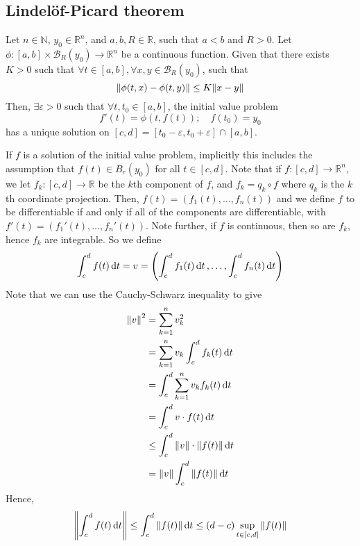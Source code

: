 \subsection{Lindel\"of-Picard theorem}
\begin{theorem}
	Let \( n \in \mathbb N \), \( y_0 \in \mathbb R^n \), and \( a,b,R \in \mathbb R \), such that \( a < b \) and \( R > 0 \).
	Let \( \phi \colon [a,b] \times \mathcal B_R(y_0) \to \mathbb R^n \) be a continuous function.
	Given that there exists \( K > 0 \) such that \( \forall t \in [a,b], \forall x,y \in \mathcal B_R(y_0) \), such that
	\[
		\norm{\phi(t,x) - \phi(t,y)} \leq K \norm{x-y}
	\]
	Then, \( \exists \varepsilon > 0 \) such that \( \forall t, t_0 \in [a,b] \), the initial value problem
	\[
		f'(t) = \phi(t, f(t));\quad f(t_0) = y_0
	\]
	has a unique solution on \( [c,d] = [t_0 - \varepsilon, t_0 + \varepsilon] \cap [a,b] \).
\end{theorem}
\begin{remark}
	If \( f \) is a solution of the initial value problem, implicitly this includes the assumption that \( f(t) \in B_r(y_0) \) for all \( t \in [c,d] \).
	Note that if \( f \colon [c,d] \to \mathbb R^n \), we let \( f_k \colon [c,d] \to \mathbb R \) be the \( k \)th component of \( f \), and \( f_k = q_k \circ f \) where \( q_k \) is the \( k \)th coordinate projection.
	Then, \( f(t) = (f_1(t), \dots, f_n(t)) \) and we define \( f \) to be differentiable if and only if all of the components are differentiable, with \( f'(t) = (f_1'(t), \dots, f_n'(t)) \).
	Note further, if \( f \) is continuous, then so are \( f_k \), hence \( f_k \) are integrable.
	So we define
	\[
		\int_c^d f(t) \dd{t} = v = \qty(\int_c^d f_1(t) \dd{t}, \dots, \int_c^d f_n(t) \dd{t})
	\]
	Note that we can use the Cauchy-Schwarz inequality to give
	\begin{align*}
		\norm{v}^2 &= \sum_{k=1}^n v_k^2 \\
		&= \sum_{k=1}^n v_k \int_c^d f_k(t) \dd{t} \\
		&= \int_c^d \sum_{k=1}^n v_k f_k(t) \dd{t} \\
		&= \int_c^d v \cdot f(t) \dd{t} \\
		&\leq \int_c^d \norm{v} \cdot \norm{f(t)} \dd{t} \\
		&= \norm{v} \int_c^d \norm{f(t)} \dd{t}
	\end{align*}
	Hence,
	\[
		\norm{\int_c^d f(t) \dd{t}} \leq \int_c^d \norm{f(t)} \dd{t} \leq (d-c) \sup_{t \in [c,d]} \norm{f(t)}
	\]
\end{remark}
